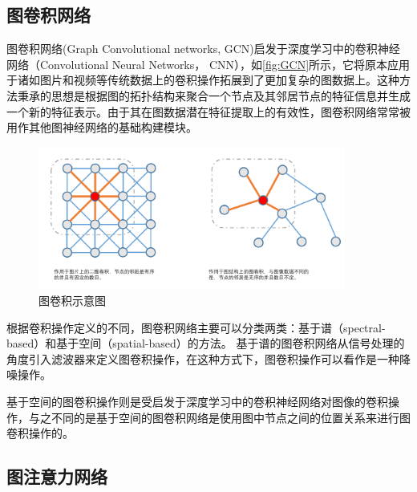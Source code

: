 \subsection{图卷积网络}
图卷积网络(Graph Convolutional networks, GCN)启发于深度学习中的卷积神经网络（Convolutional Neural Networks， CNN），如\autoref{fig:GCN}所示，它将原本应用于诸如图片和视频等传统数据上的卷积操作拓展到了更加复杂的图数据上。这种方法秉承的思想是根据图的拓扑结构来聚合一个节点及其邻居节点的特征信息并生成一个新的特征表示。由于其在图数据潜在特征提取上的有效性，图卷积网络常常被用作其他图神经网络的基础构建模块。
\begin{figure}[htb]
    \includegraphics[width=0.9\textwidth]{fig/GCN.pdf}
    \caption{图卷积示意图}
    \label{fig:GCN}
  \end{figure}
根据卷积操作定义的不同，图卷积网络主要可以分类两类：基于谱（spectral-based）和基于空间（spatial-based）的方法。
基于谱的图卷积网络从信号处理的角度引入滤波器来定义图卷积操作，在这种方式下，图卷积操作可以看作是一种降噪操作。

基于空间的图卷积操作则是受启发于深度学习中的卷积神经网络对图像的卷积操作，与之不同的是基于空间的图卷积网络是使用图中节点之间的位置关系来进行图卷积操作的。

\subsection{图注意力网络}

